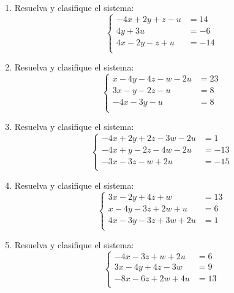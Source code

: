 \documentclass[11pt]{article}
\begin{document}
\begin{enumerate}
\[
\left\{\begin{aligned}
-4x-3y+4z+3w+4u&=20\\
-3x-y-3z+3w-u&=-14\\
-3x+y+z+w+4u&=0\\
\end{aligned}\right.
\]
\item Resuelva y clasifique el sistema:
\[
\left\{\begin{aligned}
-4x+2y+z-u&=14\\
4y+3u&=-6\\
4x-2y-z+u&=-14\\
\end{aligned}\right.
\]
\item Resuelva y clasifique el sistema:
\[
\left\{\begin{aligned}
x-4y-4z-w-2u&=23\\
3x-y-2z-u&=8\\
-4x-3y-u&=8\\
\end{aligned}\right.
\]
\item Resuelva y clasifique el sistema:
\[
\left\{\begin{aligned}
-4x+2y+2z-3w-2u&=1\\
-4x+y-2z-4w-2u&=-13\\
-3x-3z-w+2u&=-15\\
\end{aligned}\right.
\]
\item Resuelva y clasifique el sistema:
\[
\left\{\begin{aligned}
3x-2y+4z+w&=13\\
x-4y-3z+2w+u&=6\\
4x-3y-3z+3w+2u&=1\\
\end{aligned}\right.
\]
\item Resuelva y clasifique el sistema:
\[
\left\{\begin{aligned}
-4x-3z+w+2u&=6\\
3x-4y+4z-3w&=9\\
-8x-6z+2w+4u&=13\\
\end{aligned}\right.
\]
\end{enumerate}
\end{document}

